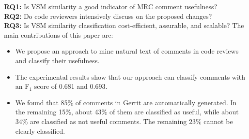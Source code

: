 \noindent \textbf{RQ1:} Is VSM similarity a good indicator of MRC comment usefulness?\\
\noindent \textbf{RQ2:} Do code reviewers intensively discuss on the proposed changes?\\
\noindent \textbf{RQ3:} Is VSM similarity classification cost-efficient, assurable, and scalable?
\noindent The main contributions of this paper are:
\begin{itemize}
\item We propose an approach to mine natural text of comments in code reviews and classify their usefulness.
\item The experimental results show that our approach can classify comments with an F$_1$ score of 0.681 and 0.693.
\item We found that 85\% of comments in Gerrit are automatically generated. In the remaining 15\%, about 43\% of them are classified as useful, while about 34\% are classified as not useful comments. The remaining 23\% cannot be clearly classified.
\end{itemize} 

